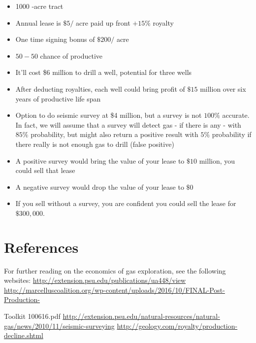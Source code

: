 \documentclass[10pt]{article}
\begin{document}
\begin{itemize}
  \item 1000 -acre tract

  \item Annual lease is $\$ 5 /$ acre paid up front $+15 \%$ royalty

  \item One time signing bonus of $\$ 200 /$ acre

  \item $50-50$ chance of productive

  \item It'll cost \$6 million to drill a well, potential for three wells

  \item After deducting royalties, each well could bring profit of $\$ 15$ million over six years of productive life span

  \item Option to do seismic survey at \$4 million, but a survey is not $100 \%$ accurate. In fact, we will assume that a survey will detect gas - if there is any - with $85 \%$ probability, but might also return a positive result with $5 \%$ probability if there really is not enough gas to drill (false positive)

  \item A positive survey would bring the value of your lease to $\$ 10$ million, you could sell that lease

  \item A negative survey would drop the value of your lease to $\$ 0$

  \item If you sell without a survey, you are confident you could sell the lease for $\$ 300,000$.

\end{itemize}
\section{References}
For further reading on the economics of gas exploration, see the following websites: \href{http://extension.psu.edu/publications/ua448/view}{http://extension.psu.edu/publications/ua448/view} \href{http://marcelluscoalition.org/wp-content/uploads/2016/10/FINAL-Post-Production-}{http://marcelluscoalition.org/wp-content/uploads/2016/10/FINAL-Post-Production-}

Toolkit 100616.pdf \href{http://extension.psu.edu/natural-resources/natural-gas/news/2010/11/seismic-surveying}{http://extension.psu.edu/natural-resources/natural-gas/news/2010/11/seismic-surveying} \href{http://geology.com/royalty/production-decline.shtml}{http://geology.com/royalty/production-decline.shtml}
\end{document}
